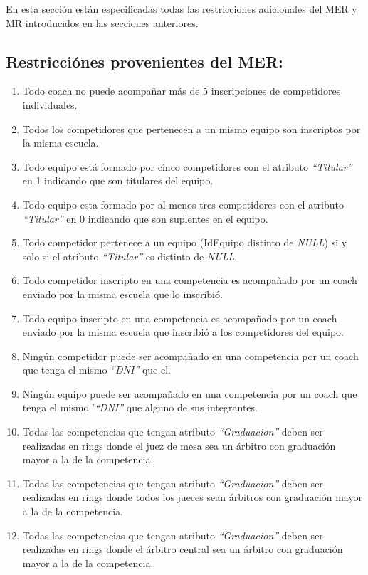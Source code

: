 En esta sección están especificadas todas las restricciones adicionales del MER y MR introducidos en las secciones anteriores.

\subsection{Restricciónes provenientes del MER:}
\begin{enumerate}
    \item Todo coach no puede acompañar más de 5 inscripciones de competidores individuales.
    \item Todos los competidores que pertenecen a un mismo equipo son inscriptos por la misma escuela.
    \item Todo equipo está formado por cinco competidores con el atributo \textit{``Titular''} en 1 indicando que son titulares del equipo.
    \item Todo equipo esta formado por al menos tres competidores con el atributo \textit{``Titular''} en 0 indicando que son suplentes en el equipo.
    \item Todo competidor pertenece a un equipo (IdEquipo distinto de \textit{NULL}) si y solo si el atributo \textit{``Titular''} es distinto de \textit{NULL}.
    \item Todo competidor inscripto en una competencia es acompañado por un coach enviado por la misma escuela que lo inscribió.
    \item Todo equipo inscripto en una competencia es acompañado por un coach enviado por la misma escuela que inscribió a los competidores del equipo.
    \item Ningún competidor puede ser acompañado en una competencia por un coach que tenga el mismo \textit{``DNI''} que el.
    \item Ningún equipo puede ser acompañado en una competencia por un coach que tenga el mismo '\textit{``DNI''} que alguno de sus integrantes.
    \item Todas las competencias que tengan atributo \textit{``Graduacion''} deben ser realizadas en rings donde el juez de mesa sea un árbitro con graduación mayor a la de la competencia.
    \item Todas las competencias que tengan atributo \textit{``Graduacion''} deben ser realizadas en rings donde todos los jueces sean árbitros con graduación mayor a la de la competencia.
    \item Todas las competencias que tengan atributo \textit{``Graduacion''} deben ser realizadas en rings donde el árbitro central sea un árbitro con graduación mayor a la de la competencia.

\end{enumerate}
